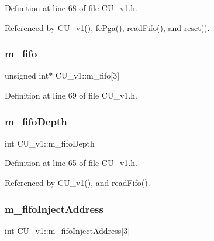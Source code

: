 Definition at line 68 of file C\+U\+\_\+v1.\+h.



Referenced by C\+U\+\_\+v1(), fe\+Pga(), read\+Fifo(), and reset().

\mbox{\label{classCU__v1_abdc4ba4c63bcc1bbe2d7cd2a47b02b01}} 
\subsubsection{\texorpdfstring{m\+\_\+fifo}{m\_fifo}}
{\footnotesize\ttfamily unsigned int$\ast$ C\+U\+\_\+v1\+::m\+\_\+fifo\mbox{[}3\mbox{]}\hspace{0.3cm}{\ttfamily [private]}}



Definition at line 69 of file C\+U\+\_\+v1.\+h.

\mbox{\label{classCU__v1_abc59a6644473bc4fdccc24e2a0c9d6ae}} 
\subsubsection{\texorpdfstring{m\+\_\+fifo\+Depth}{m\_fifoDepth}}
{\footnotesize\ttfamily int C\+U\+\_\+v1\+::m\+\_\+fifo\+Depth\hspace{0.3cm}{\ttfamily [private]}}



Definition at line 65 of file C\+U\+\_\+v1.\+h.



Referenced by C\+U\+\_\+v1(), and read\+Fifo().

\mbox{\label{classCU__v1_acc7767c15f48718ebc1ee87e22ab9fc1}} 
\subsubsection{\texorpdfstring{m\+\_\+fifo\+Inject\+Address}{m\_fifoInjectAddress}}
{\footnotesize\ttfamily int C\+U\+\_\+v1\+::m\+\_\+fifo\+Inject\+Address\mbox{[}3\mbox{]}\hspace{0.3cm}{\ttfamily [private]}}



